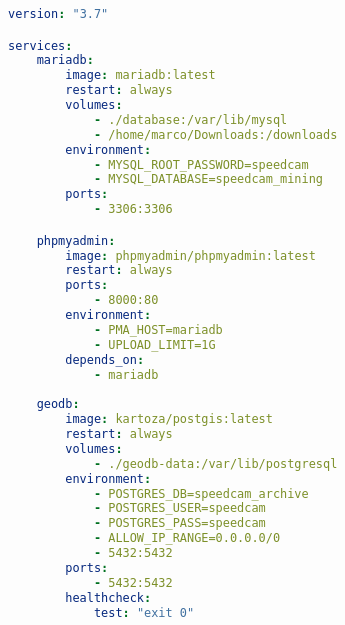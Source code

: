 \begin{minipage}{\linewidth}
\begin{lstlisting}[language={YAML}, basicstyle=\footnotesize\ttfamily\linespread{1.3}, caption={Docker-Compose Datei mit MariaDB, PhpMyAdmin und PostGIS}, captionpos=b, label=lst:DockerComposeDBs]
version: "3.7"

services:
    mariadb:
        image: mariadb:latest
        restart: always
        volumes:
            - ./database:/var/lib/mysql
            - /home/marco/Downloads:/downloads
        environment:
            - MYSQL_ROOT_PASSWORD=speedcam
            - MYSQL_DATABASE=speedcam_mining
        ports:
            - 3306:3306

    phpmyadmin:
        image: phpmyadmin/phpmyadmin:latest
        restart: always
        ports:
            - 8000:80
        environment:
            - PMA_HOST=mariadb
            - UPLOAD_LIMIT=1G
        depends_on:
            - mariadb
    
    geodb:
        image: kartoza/postgis:latest
        restart: always
        volumes:
            - ./geodb-data:/var/lib/postgresql
        environment:
            - POSTGRES_DB=speedcam_archive
            - POSTGRES_USER=speedcam
            - POSTGRES_PASS=speedcam
            - ALLOW_IP_RANGE=0.0.0.0/0
            - 5432:5432
        ports:
            - 5432:5432
        healthcheck:
            test: "exit 0"
\end{lstlisting}
\end{minipage}